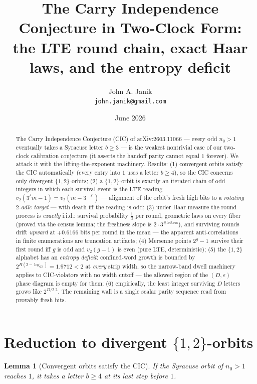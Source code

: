 \documentclass[11pt]{article}
\title{The Carry Independence Conjecture in Two-Clock Form:\\
the LTE round chain, exact Haar laws, and the entropy deficit}
\author{John A. Janik\\ \small\texttt{john.janik@gmail.com}}
\date{June 2026}
\newtheorem{lemma}{Lemma}
\newcommand{\vt}{v_2}
\begin{document}
\maketitle

\begin{abstract}
The Carry Independence Conjecture (CIC) of arXiv:2603.11066 --- every
odd $n_0>1$ eventually takes a Syracuse letter $b\ge3$ --- is the
weakest nontrivial case of our two-clock calibration conjecture (it
asserts the handoff parity cannot equal $1$ forever). We attack it
with the lifting-the-exponent machinery. Results: (1) convergent
orbits satisfy the CIC automatically (every entry into $1$ uses a
letter $b\ge4$), so the CIC concerns only divergent $\{1,2\}$-orbits;
(2) a $\{1,2\}$-orbit is exactly an iterated chain of odd integers in
which each survival event is the LTE reading
$\vt(3^\ell m-1)=\vt(m-3^{-\ell})$ --- alignment of the orbit's fresh
high bits to a \emph{rotating $2$-adic target} --- with death iff the
reading is odd; (3) under Haar measure the round process is
\emph{exactly} i.i.d.: survival probability $\tfrac13$ per round,
geometric laws on every fiber (proved via the census lemma; the
freshness slope is $2\cdot3^{\#\text{letters}}$), and surviving rounds
drift \emph{upward} at $+0.6166$ bits per round in the mean --- the
apparent anti-correlations in finite enumerations are truncation
artifacts; (4) Mersenne points $2^g-1$ survive their first round iff
$g$ is odd and $\vt(g-1)$ is even (pure LTE, deterministic); (5) the
$\{1,2\}$ alphabet has an \emph{entropy deficit}: confined-word growth
is bounded by $2^{H(2-\log_23)}=1.9712<2$ at \emph{every} strip width,
so the narrow-band dwell machinery applies to CIC-violators with no
width cutoff --- the allowed region of the $(D,\varepsilon)$ phase
diagram is empty for them; (6) empirically, the least integer
surviving $D$ letters grows like $2^{D/2.2}$. The remaining wall is a
single scalar parity sequence read from provably fresh bits.
\end{abstract}

\section{Reduction to divergent $\{1,2\}$-orbits}

\begin{lemma}[Convergent orbits satisfy the CIC]\label{lem:conv}
If the Syracuse orbit of $n_0>1$ reaches $1$, it takes a letter
$b\ge4$ at its last step before $1$.
\end{lemma}
\end{document}
